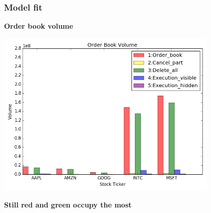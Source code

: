 \documentclass[xcolor={x11names,svgnames,dvipsnames}]{beamer}
\begin{document}
\begin{frame}
\frametitle{Model fit}
\textbf{Order book volume}

\begin{center}	
\includegraphics[width=0.8\textwidth, height=0.6\textheight]{order_book_volume.png}
\end{center}
\textbf{Still red and green occupy the most}
\end{frame}
\end{document}
